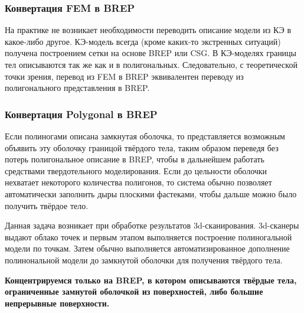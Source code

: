 \subsubsection{Конвертация FEM в BREP}\label{sec:secFEMtoBREP}

На практике не возникает необходимости переводить описание модели из КЭ в какое-либо другое. КЭ-модель всегда (кроме каких-то экстренных ситуаций) получена построением сетки на основе BREP или CSG.
В КЭ-моделях границы тел описываются так же как и в полигональных. Следовательно, с теоретической точки зрения, перевод из FEM в BREP эквивалентен переводу из полигонального представления в BREP.

\subsubsection{Конвертация Polygonal в BREP}\label{sec:secPolyToBREP}

Если полиногами описана замкнутая оболочка, то представляется возможным объявить эту оболочку границой твёрдого тела, таким образом переведя без потерь полигональное описание в BREP, чтобы в дальнейшем работать средствами твердотельного моделирования. Если до цельности оболочки нехватает некоторого количества полигонов, то система обычно позволяет автоматически заполнить дыры плоскими фастеками, чтобы дальше можно было получить твёрдое тело.

Данная задача возникает при обработке результатов 3d-сканирования. 3d-сканеры выдают облако точек и первым этапом выполняется построение полиногальной модели по точкам. Затем обычно выполняется автоматизированное дополнение полинональной модели до замкнутой оболочки для получения твёрдого тела.


\textbf{Концентрируемся только на BREP, в котором описываются твёрдые тела, ограниченные замнутой оболочкой из поверхностей, либо большие непрерывные поверхности.}



